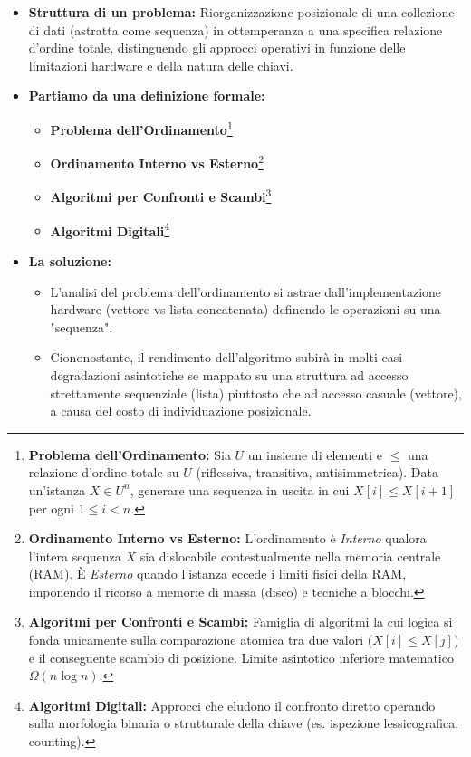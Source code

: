 \documentclass[a4paper, 11pt]{report}
\newcommand{\definizione}[2]{%
\textbf{#1}\footnote{\textbf{#1:} #2}%
}
\begin{document}
\begin{itemize}
    \item \textbf{Struttura di un problema:}
    Riorganizzazione posizionale di una collezione di dati (astratta come sequenza) in ottemperanza a una specifica relazione d'ordine totale, distinguendo gli approcci operativi in funzione delle limitazioni hardware e della natura delle chiavi.

    \item \textbf{Partiamo da una definizione formale:}
    \begin{itemize}
        \item \definizione{Problema dell'Ordinamento}{Sia $U$ un insieme di elementi e $\le$ una relazione d'ordine totale su $U$ (riflessiva, transitiva, antisimmetrica). Data un'istanza $X \in U^n$, generare una sequenza in uscita in cui $X[i] \le X[i+1]$ per ogni $1 \le i < n$.}
        \item \definizione{Ordinamento Interno vs Esterno}{L'ordinamento è \textit{Interno} qualora l'intera sequenza $X$ sia dislocabile contestualmente nella memoria centrale (RAM). È \textit{Esterno} quando l'istanza eccede i limiti fisici della RAM, imponendo il ricorso a memorie di massa (disco) e tecniche a blocchi.}
        \item \definizione{Algoritmi per Confronti e Scambi}{Famiglia di algoritmi la cui logica si fonda unicamente sulla comparazione atomica tra due valori ($X[i] \le X[j]$) e il conseguente scambio di posizione. Limite asintotico inferiore matematico $\Omega(n \log n)$.}
        \item \definizione{Algoritmi Digitali}{Approcci che eludono il confronto diretto operando sulla morfologia binaria o strutturale della chiave (es. ispezione lessicografica, counting).}
    \end{itemize}

    \item \textbf{La soluzione:}
    \begin{itemize}
        \item L'analisi del problema dell'ordinamento si astrae dall'implementazione hardware (vettore vs lista concatenata) definendo le operazioni su una "sequenza".
        \item Ciononostante, il rendimento dell'algoritmo subirà in molti casi degradazioni asintotiche se mappato su una struttura ad accesso strettamente sequenziale (lista) piuttosto che ad accesso casuale (vettore), a causa del costo di individuazione posizionale.
    \end{itemize}
\end{itemize}
\end{document}
